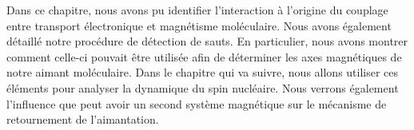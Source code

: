 \vspace{1cm}
Dans ce chapitre, nous avons pu identifier l'interaction à l'origine du couplage entre transport électronique et magnétisme moléculaire. Nous avons également détaillé notre procédure de détection de sauts. En particulier, nous avons montrer comment celle-ci pouvait être utilisée afin de déterminer les axes magnétiques de notre aimant moléculaire. Dans le chapitre qui va suivre, nous allons utiliser ces éléments pour analyser la dynamique du spin nucléaire. Nous verrons également l'influence que peut avoir un second système magnétique sur le mécanisme de retournement de l'aimantation.